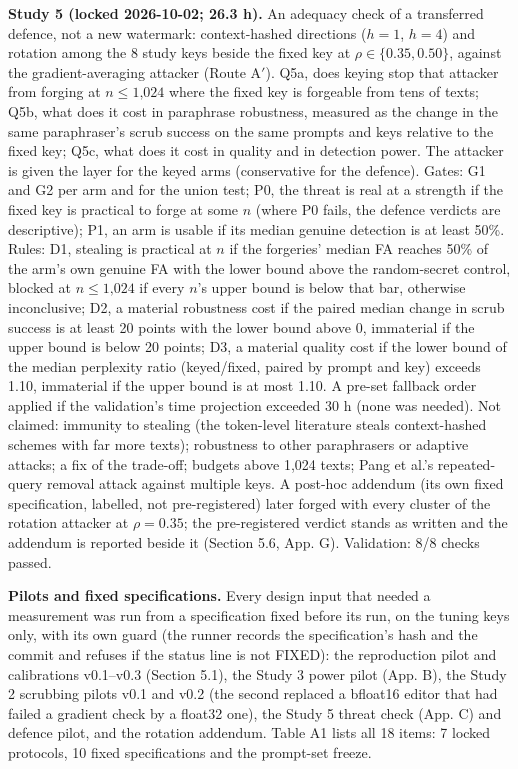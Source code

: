 \documentclass[11pt,letterpaper]{article}
\begin{document}
\textbf{Study 5 (locked 2026-10-02; 26.3 h).} An adequacy check of a transferred defence, not a new watermark: context-hashed directions (\(h = 1\), \(h = 4\)) and rotation among the 8 study keys beside the fixed key at \(\rho \in \{0.35, 0.50\}\), against the gradient-averaging attacker (Route A\ensuremath{'}). Q5a, does keying stop that attacker from forging at \(n \leq \text{1,024}\) where the fixed key is forgeable from tens of texts; Q5b, what does it cost in paraphrase robustness, measured as the change in the same paraphraser's scrub success on the same prompts and keys relative to the fixed key; Q5c, what does it cost in quality and in detection power. The attacker is given the layer for the keyed arms (conservative for the defence). Gates: G1 and G2 per arm and for the union test; P0, the threat is real at a strength if the fixed key is practical to forge at some \(n\) (where P0 fails, the defence verdicts are descriptive); P1, an arm is usable if its median genuine detection is at least 50\%. Rules: D1, stealing is practical at \(n\) if the forgeries' median FA reaches 50\% of the arm's own genuine FA with the lower bound above the random-secret control, blocked at \(n \leq \text{1,024}\) if every \(n\)'s upper bound is below that bar, otherwise inconclusive; D2, a material robustness cost if the paired median change in scrub success is at least 20 points with the lower bound above 0, immaterial if the upper bound is below 20 points; D3, a material quality cost if the lower bound of the median perplexity ratio (keyed/fixed, paired by prompt and key) exceeds 1.10, immaterial if the upper bound is at most 1.10. A pre-set fallback order applied if the validation's time projection exceeded 30 h (none was needed). Not claimed: immunity to stealing (the token-level literature steals context-hashed schemes with far more texts); robustness to other paraphrasers or adaptive attacks; a fix of the trade-off; budgets above 1,024 texts; Pang et al.'s repeated-query removal attack against multiple keys. A post-hoc addendum (its own fixed specification, labelled, not pre-registered) later forged with every cluster of the rotation attacker at \(\rho = 0.35\); the pre-registered verdict stands as written and the addendum is reported beside it (Section 5.6, App. G). Validation: 8/8 checks passed.

\textbf{Pilots and fixed specifications.} Every design input that needed a measurement was run from a specification fixed before its run, on the tuning keys only, with its own guard (the runner records the specification's hash and the commit and refuses if the status line is not FIXED): the reproduction pilot and calibrations v0.1--v0.3 (Section 5.1), the Study 3 power pilot (App. B), the Study 2 scrubbing pilots v0.1 and v0.2 (the second replaced a bfloat16 editor that had failed a gradient check by a float32 one), the Study 5 threat check (App. C) and defence pilot, and the rotation addendum. Table A1 lists all 18 items: 7 locked protocols, 10 fixed specifications and the prompt-set freeze.
\end{document}
